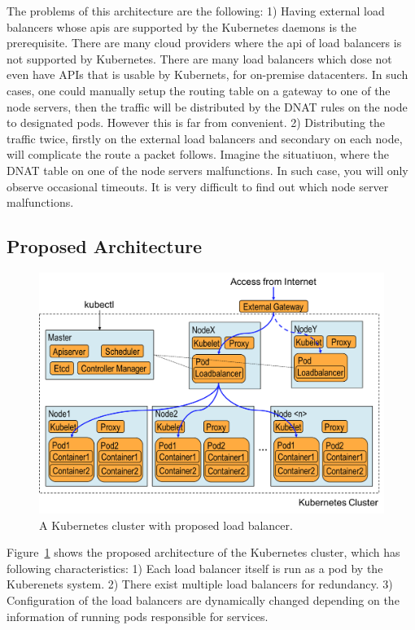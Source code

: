 The problems of this architecture are the following: 
1) Having external load balancers whose apis are supported by the Kubernetes daemons is the prerequisite. 
There are many cloud providers where the api of load balancers is not supported by Kubernetes. 
There are many load balancers which dose not even have APIs that is usable by Kubernets, for on-premise datacenters.  
In such cases, one could manually setup the routing table on a gateway to one of the node servers, 
then the traffic will be distributed by the DNAT rules on the node to designated pods.
However this is far from convenient.
2) Distributing the traffic twice, firstly on the external load balancers and secondary on each node, 
will complicate the route a packet follows. Imagine the situatiuon, where the DNAT table on one of the node servers malfunctions.
In such case, you will only observe occasional timeouts. It is very difficult to find out which node server malfunctions.   

\subsection{Proposed Architecture}

\begin{figure}
\includegraphics[width=\columnwidth]{Figs/K8sProposed}
\caption{A Kubernetes cluster with proposed load balancer.}
\label{fig:K8sProposed}
\end{figure}

Figure~\ref{fig:K8sProposed} shows the proposed architecture of the Kubernetes cluster, 
which has following characteristics:
1) Each load balancer itself is run as a pod by the Kuberenets system. 
2) There exist multiple load balancers for redundancy. 
3) Configuration of the load balancers are dynamically changed depending on the information of running pods responsible for services.

